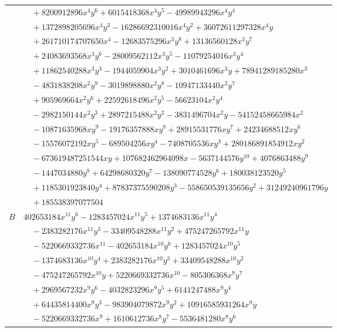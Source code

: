 \documentclass[11pt]{article}
\begin{document}
\begin{longtable}{@{}ll@{}}
 & $\quad +8200912896x^{4}y^{6}+6015418368x^{4}y^{5}-49989943296x^{4}y^{4}$\\
 & $\quad +1372898205696x^{4}y^{3}-16286692310016x^{4}y^{2}+36072611297328x^{4}y$\\
 & $\quad +261710174707650x^{4}-12683575296x^{3}y^{8}+13136560128x^{3}y^{7}$\\
 & $\quad +24083693568x^{3}y^{6}-28009562112x^{3}y^{5}-11079254016x^{3}y^{4}$\\
 & $\quad +11862540288x^{3}y^{3}-1944059904x^{3}y^{2}+3010461696x^{3}y+78941289185280x^{3}$\\
 & $\quad -4831838208x^{2}y^{9}-3019898880x^{2}y^{8}-10947133440x^{2}y^{7}$\\
 & $\quad +905969664x^{2}y^{6}+22592618496x^{2}y^{5}-56623104x^{2}y^{4}$\\
 & $\quad -2982150144x^{2}y^{3}+2897215488x^{2}y^{2}-3831496704x^{2}y-54152458665984x^{2}$\\
 & $\quad -10871635968xy^{9}-19176357888xy^{8}+28915531776xy^{7}+24234688512xy^{6}$\\
 & $\quad -15576072192xy^{5}-689504256xy^{4}-7408705536xy^{3}+280186891854912xy^{2}$\\
 & $\quad -673619487251544xy+107682462964098x-5637144576y^{10}+4076863488y^{9}$\\
 & $\quad -1447034880y^{8}+64298680320y^{7}-138090774528y^{6}+180038123520y^{5}$\\
 & $\quad +1185301923840y^{4}+87837375590208y^{3}-558650539135656y^{2}+31249240961796y$\\
 & $\quad +185538397077504$\\
$B$ & $402653184x^{11}y^{6}-1283457024x^{11}y^{5}+1374683136x^{11}y^{4}$\\
 & $\quad -2383282176x^{11}y^{3}-33409548288x^{11}y^{2}+475247265792x^{11}y$\\
 & $\quad -5220669332736x^{11}-402653184x^{10}y^{6}+1283457024x^{10}y^{5}$\\
 & $\quad -1374683136x^{10}y^{4}+2383282176x^{10}y^{3}+33409548288x^{10}y^{2}$\\
 & $\quad -475247265792x^{10}y+5220669332736x^{10}-805306368x^{9}y^{7}$\\
 & $\quad +2969567232x^{9}y^{6}-4032823296x^{9}y^{5}+6141247488x^{9}y^{4}$\\
 & $\quad +64435814400x^{9}y^{3}-983904079872x^{9}y^{2}+10916585931264x^{9}y$\\
 & $\quad -5220669332736x^{9}+1610612736x^{8}y^{7}-5536481280x^{8}y^{6}$\\

\end{longtable}
\end{document}
